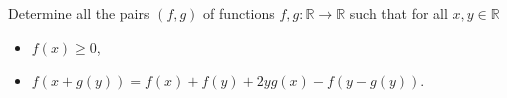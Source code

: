 Determine all the pairs $(f,g)$ of functions $f,g \colon \mathbb{R} \to \mathbb{R}$ such that
for all $x,y\in\mathbb{R}$
\begin{itemize}
\item $f(x)\geq 0$,
\item $f(x+g(y)) = f(x) + f(y) + 2yg(x) - f(y-g(y))$.
\end{itemize}

